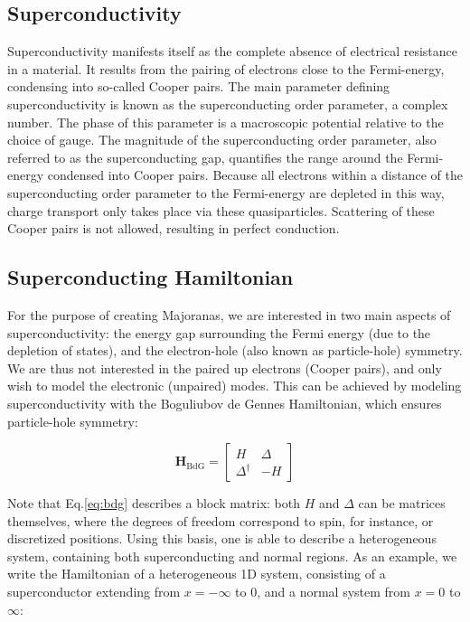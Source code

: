     \subsection{Superconductivity}
        Superconductivity manifests itself as the complete absence of electrical resistance in a material.
        It results from the pairing of electrons close to the Fermi-energy, condensing into so-called Cooper pairs.
        The main parameter defining superconductivity is known as the superconducting order parameter, a complex number.
        The phase of this parameter is a macroscopic potential relative to the choice of gauge.
        The magnitude of the superconducting order parameter, also referred to as the superconducting gap, quantifies the range around the Fermi-energy condensed into Cooper pairs.
        Because all electrons within a distance of the superconducting order parameter to the Fermi-energy are depleted in this way, charge transport only takes place via these quasiparticles.
        Scattering of these Cooper pairs is not allowed, resulting in perfect conduction.

    \subsection{Superconducting Hamiltonian}
        For the purpose of creating Majoranas, we are interested in two main aspects of superconductivity: the energy gap surrounding the Fermi energy (due to the depletion of states), and the electron-hole (also known as particle-hole) symmetry.
        We are thus not interested in the paired up electrons (Cooper pairs), and only wish to model the electronic (unpaired) modes.
        This can be achieved by modeling superconductivity with the Boguliubov de Gennes Hamiltonian, which ensures particle-hole symmetry:
        
        \begin{equation}
        \mathbf{H}_\text{BdG} = \begin{bmatrix} H & \Delta \\ \Delta^\dagger & -H \end{bmatrix}
        \label{eq:bdg}
        \end{equation}

        Note that Eq.\eqref{eq:bdg} describes a block matrix: both $H$ and $\Delta$ can be matrices themselves, where the degrees of freedom correspond to spin, for instance, or discretized positions.
        Using this basis, one is able to describe a heterogeneous system, containing both superconducting and normal regions.
        As an example, we write the Hamiltonian of a heterogeneous 1D system, consisting of a superconductor extending from $x = -\infty$ to $0$, and a normal system from  $x = 0$ to $\infty$:

